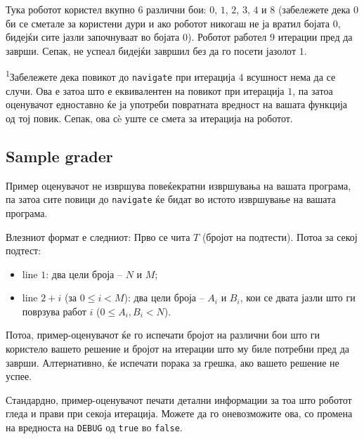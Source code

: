 \documentclass[12pt]{article}
\begin{document}
Тука роботот користел вкупно $6$ различни бои: $0$, $1$, $2$, $3$, $4$ и $8$ (забележете дека $0$ би се сметале за користени дури и ако роботот никогаш не ја вратил бојата $0$, бидејќи сите јазли започнуваат во бојата $0$). Роботот работел $9$ итерации пред да заврши. Сепак, не успеал бидејќи завршил без да го посети јазолот $1$.

\textsuperscript{1}Забележете дека повикот до \texttt{navigate} при итерација $4$ всушност нема да се случи. Ова е затоа што е еквивалентен на повикот при итерација $1$, па затоа оценувачот едноставно ќе ја употреби повратната вредност на вашата функција од тој повик. Сепак, ова сè уште се смета за итерација на роботот.

\subsection{Sample grader}

Пример оценувачот не извршува повеќекратни извршувања на вашата програма, па затоа сите повици до \texttt{navigate} ќе бидат во истото извршување на вашата програма.

Влезниот формат е следниот: Прво се чита $T$ (бројот на подтести). Потоа за секој подтест:
\begin{itemize}
\item line $1$: два цели броја -- $N$ и $M$;
\item line $2+i$ (за $0 \leq i < M$): два цели броја -- $A_i$ и $B_i$, кои се двата јазли што ги поврзува работ $i$ ($0 \leq A_i, B_i < N$).
\end{itemize}

Потоа, пример-оценувачот ќе го испечати бројот на различни бои што ги користело вашето решение и бројот на итерации што му биле потребни пред да заврши. Алтернативно, ќе испечати порака за грешка, ако вашето решение не успее.

Стандардно, пример-оценувачот печати детални информации за тоа што роботот гледа и прави при секоја итерација. Можете да го оневозможите ова, со промена на вредноста на \texttt{DEBUG} од \texttt{true} во \texttt{false}.
\end{document}
